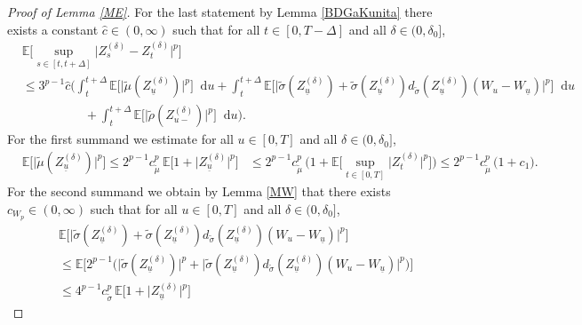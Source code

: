 \documentclass[11pt,a4paper]{article}
\numberwithin{equation}{section}
\theoremstyle{definition}
\newcommand{\E}{{\mathbb{E}}}
\newcommand{\diff}{\mathop{}\!\mathrm{d}}
\begin{document}
\begin{proof}[Proof of Lemma \ref{ME}]
For the last statement by Lemma \ref{BDGaKunita} there exists a constant $\hat c\in(0,\infty)$ such that for all $t\in[0,T-\Delta]$ and all $\delta\in(0,\delta_0]$,
\begin{equation}\label{ME34}
    \begin{aligned}
    &\E\Big[ \sup_{s\in[t,t+\Delta]} \big|Z^{(\delta)}_s- Z^{(\delta)}_{t}\big|^p\Big]\\
    &\leq 3^{p-1}\hat c \Big(\int_{t}^{t+\Delta}\E\big[  \big|   \widetilde\mu (Z^{(\delta)}_{\underline u}) \big|^p\big] \diff u
    + \int_{t}^{t+\Delta}\E\big[\big|   \widetilde\sigma (Z^{(\delta)}_{\underline u}) + \widetilde\sigma (Z^{(\delta)}_{\underline u}) d_{\widetilde\sigma}(Z^{(\delta)}_{\underline u}) (W_u -W_{\underline u}) \big|^p\big] \diff u\\
    &\quad\quad\quad\quad\quad +\int_{t}^{t+\Delta} \E\Big[\big| \widetilde\rho (Z^{(\delta)}_{u-}) \big|^p \Big]\diff u\Big).
    \end{aligned}
\end{equation}
For the first summand we estimate for all $u\in[0,T]$ and all $\delta\in(0,\delta_0]$,
\begin{equation}\label{ME35}
    \begin{aligned}
    &\E\big[  \big|   \widetilde\mu (Z^{(\delta)}_{\underline u}) \big|^p\big] 
    \leq 2^{p-1} c_{\widetilde\mu}^p\, \E\big[  1+ \big|Z^{(\delta)}_{\underline u} \big|^p\big] 
    &\leq 2^{p-1} c_{\widetilde\mu}^p\, \Big( 1+  \E\big[ \sup_{t\in[0,T]}\big|Z^{(\delta)}_{t}\big|^p\big]\Big)
    \leq  2^{p-1} c_{\widetilde\mu}^p\, \big( 1+  c_1\big).
    \end{aligned}
\end{equation}
For the second summand we obtain by Lemma \ref{MW} that there exists $c_{W_p}\in (0,\infty)$ such that for all $u\in[0,T]$ and all $\delta\in(0,\delta_0]$,
\begin{equation}\label{ME36}
    \begin{aligned}
    &\E\big[\big|   \widetilde\sigma (Z^{(\delta)}_{\underline u}) + \widetilde\sigma (Z^{(\delta)}_{\underline u}) d_{\widetilde\sigma}(Z^{(\delta)}_{\underline u}) (W_u -W_{\underline u}) \big|^p\big]\\
    &\leq \E\Big[  2^{p-1} \big( \big|\widetilde\sigma (Z^{(\delta)}_{\underline u})\big|^p + \big|\widetilde\sigma (Z^{(\delta)}_{\underline u}) d_{\widetilde\sigma}(Z^{(\delta)}_{\underline u}) (W_u -W_{\underline u})\big|^p\big) \Big]\\
    &\leq 4^{p-1} c_{\widetilde\sigma}^p\, \E\big[   1+\big|Z^{(\delta)}_{\underline u}\big|^p\big]

\end{aligned}
\end{equation}
\end{proof}
\end{document}
